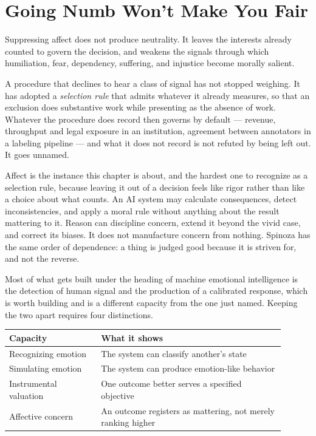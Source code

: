 \section{Going Numb Won't Make You Fair}
\label{sec:numb-fair}
Suppressing affect does not produce neutrality. It leaves the interests already counted to govern the decision, and weakens the signals through which humiliation, fear, dependency, suffering, and injustice become morally salient.

A procedure that declines to hear a class of signal has not stopped weighing. It has adopted a \emph{selection rule} that admits whatever it already measures, so that an exclusion does substantive work while presenting as the absence of work. Whatever the procedure does record then governs by default — revenue, throughput and legal exposure in an institution, agreement between annotators in a labeling pipeline — and what it does not record is not refuted by being left out. It goes unnamed.

Affect is the instance this chapter is about, and the hardest one to recognize as a selection rule, because leaving it out of a decision feels like rigor rather than like a choice about what counts. An AI system may calculate consequences, detect inconsistencies, and apply a moral rule without anything about the result mattering to it. Reason can discipline concern, extend it beyond the vivid case, and correct its biases. It does not manufacture concern from nothing. Spinoza has the same order of dependence: a thing is judged good because it is striven for, and not the reverse.

Most of what gets built under the heading of machine emotional intelligence is the detection of human signal and the production of a calibrated response, which is worth building and is a different capacity from the one just named. Keeping the two apart requires four distinctions.

\begin{center}
\small
\begin{tabular}{@{}p{0.30\linewidth}p{0.60\linewidth}@{}}
\textbf{Capacity} & \textbf{What it shows} \\
\hline
\rule{0pt}{2.6ex}Recognizing emotion & The system can classify another's state \\[3pt]
Simulating emotion & The system can produce emotion-like behavior \\[3pt]
Instrumental valuation & One outcome better serves a specified objective \\[3pt]
Affective concern & An outcome registers as mattering, not merely ranking higher \\
\end{tabular}
\end{center}

